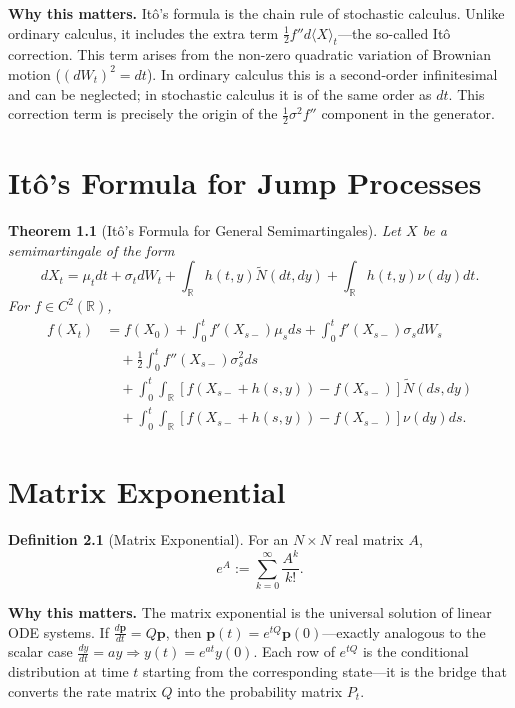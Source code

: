 \documentclass[11pt,a4paper,openany]{book}
\theoremstyle{definition}
\newtheorem{definition}{Definition}[chapter]
\theoremstyle{plain}
\newtheorem{theorem}{Theorem}[chapter]
\theoremstyle{remark}
\newcommand{\1}{\mathbbm{1}}
\newcommand{\R}{\mathbb{R}}
\begin{document}
\medskip
\noindent\textbf{Why this matters.} It\^{o}'s formula is the chain rule of stochastic calculus. Unlike ordinary calculus, it includes the extra term $\frac{1}{2} f'' d\langle X \rangle_t$---the so-called It\^{o} correction. This term arises from the non-zero quadratic variation of Brownian motion ($(dW_t)^2 = dt$). In ordinary calculus this is a second-order infinitesimal and can be neglected; in stochastic calculus it is of the same order as $dt$. This correction term is precisely the origin of the $\frac{1}{2}\sigma^2 f''$ component in the generator.

\chapter{It\^{o}'s Formula for Jump Processes}

\begin{theorem}[It\^{o}'s Formula for General Semimartingales]
Let $X$ be a semimartingale of the form
\[
dX_{t} = \mu_{t} dt + \sigma_{t} dW_{t} + \int_{\R} h(t, y) \widetilde{N}(dt, dy) + \int_{\R} h(t, y) \nu(dy) dt.
\]
For $f \in C^{2}(\R)$,
\[
\begin{aligned}
f(X_{t}) &= f(X_{0}) + \int_{0}^{t} f'(X_{s-}) \mu_{s} ds + \int_{0}^{t} f'(X_{s-}) \sigma_{s} dW_{s} \\
&\quad + \frac{1}{2} \int_{0}^{t} f''(X_{s-}) \sigma_{s}^{2} ds \\
&\quad + \int_{0}^{t} \int_{\R} \left[f(X_{s-} + h(s, y)) - f(X_{s-})\right] \widetilde{N}(ds, dy) \\
&\quad + \int_{0}^{t} \int_{\R} \left[f(X_{s-} + h(s, y)) - f(X_{s-})\right] \nu(dy) ds.
\end{aligned}
\]
\end{theorem}

\chapter{Matrix Exponential}

\begin{definition}[Matrix Exponential]
For an $N \times N$ real matrix $A$,
\[
e^{A} := \sum_{k=0}^{\infty} \frac{A^{k}}{k!}.
\]
\end{definition}

\medskip
\noindent\textbf{Why this matters.} The matrix exponential is the universal solution of linear ODE systems. If $\frac{d\mathbf{p}}{dt} = Q \mathbf{p}$, then $\mathbf{p}(t) = e^{tQ}\mathbf{p}(0)$---exactly analogous to the scalar case $\frac{dy}{dt} = ay \Rightarrow y(t) = e^{at}y(0)$. Each row of $e^{tQ}$ is the conditional distribution at time $t$ starting from the corresponding state---it is the bridge that converts the rate matrix $Q$ into the probability matrix $P_t$.
\end{document}
